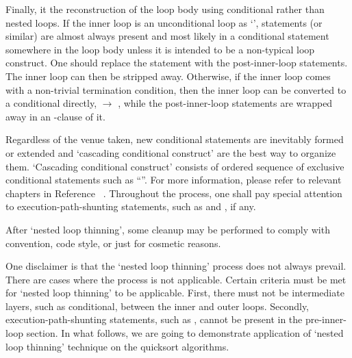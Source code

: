 Finally, it the reconstruction of the loop body using conditional rather than nested loops.
If the inner loop is an unconditional loop as `',
 statements (or similar) are almost always present and most likely
in a conditional statement somewhere in the loop body unless
it is intended to be a non-typical loop construct.
One should replace the  statement with the post-inner-loop statements.
The inner loop can then be stripped away.
Otherwise, if the inner loop comes with a non-trivial termination condition,
then the inner loop can be converted to a conditional directly,
 $\rightarrow$ ,
while the post-inner-loop statements are wrapped away in an -clause of it.


Regardless of the venue taken, new conditional statements are inevitably formed or extended
and `cascading conditional construct' are the best way to organize them.
`Cascading conditional construct' consists of ordered sequence of exclusive conditional
statements such as ``''.
For more information, please refer to relevant chapters in Reference ~\cite{Wan:book}.
Throughout the process, one shall pay special attention to execution-path-shunting statements,
such as  and , if any.


After `nested loop thinning', some cleanup may be performed to comply with convention, code
style, or just for cosmetic reasons.


One disclaimer is that the `nested loop thinning' process does not always prevail.
There are cases where the process is not applicable.
Certain criteria must be met for `nested loop thinning' to be applicable.
First, there must not be intermediate layers, such as
conditional, between the inner and outer loops.
Secondly, execution-path-shunting statements, such as , cannot be present in the
pre-inner-loop section.
In what follows, we are going to demonstrate application of `nested loop thinning' technique
on the quicksort algorithms.
